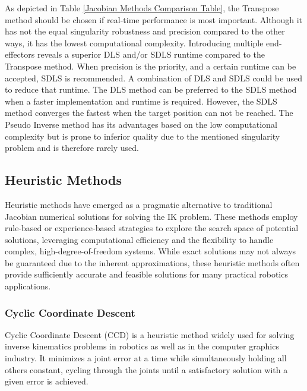 \documentclass[conference]{IEEEtran}
\begin{document}
As depicted in Table \ref{Jacobian Methods Comparison Table}, the Transpose method should be chosen if real-time performance is most important. Although it has not the equal singularity robustness and precision compared to the other ways, it has the lowest computational complexity\cite{duleba_comparison_2013}. Introducing multiple end-effectors reveals a superior DLS and/or SDLS runtime compared to the Transpose method. When precision is the priority, and a certain runtime can be accepted, SDLS is recommended. A combination of DLS and SDLS could be used to reduce that runtime. The DLS method can be preferred to the SDLS method when a faster implementation and runtime is required. However, the SDLS method converges the fastest when the target position can not be reached. The Pseudo Inverse method has its advantages based on the low computational complexity but is prone to inferior quality due to the mentioned singularity problem and is therefore rarely used.

\subsection{Heuristic Methods}
Heuristic methods have emerged as a pragmatic alternative to traditional Jacobian numerical solutions for solving the IK problem. These methods employ rule-based or experience-based strategies to explore the search space of potential solutions, leveraging computational efficiency and the flexibility to handle complex, high-degree-of-freedom systems. While exact solutions may not always be guaranteed due to the inherent approximations, these heuristic methods often provide sufficiently accurate and feasible solutions for many practical robotics applications.
\subsubsection{Cyclic Coordinate Descent}
Cyclic Coordinate Descent (CCD) is a heuristic method \cite{wang_combined_1991}\cite{welman_inverse_1993} widely used for solving inverse kinematics problems in robotics as well as in the computer graphics industry. It minimizes a joint error at a time while simultaneously holding all others constant, cycling through the joints until a satisfactory solution with a given error is achieved.
\end{document}
